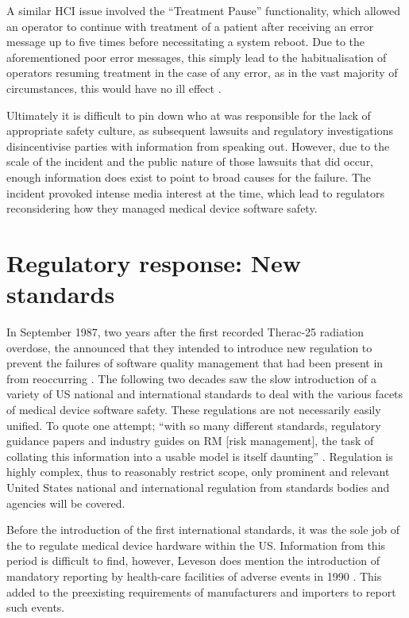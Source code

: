 \documentclass{cshonours}
\newcommand{\ther}{Therac-25\xspace}
\begin{document}
A similar HCI issue involved the ``Treatment Pause'' functionality, which allowed an operator to continue with treatment of a patient after receiving an error message up to five times before necessitating a system reboot. Due to the aforementioned poor error messages, this simply lead to the habitualisation of operators resuming treatment in the case of any error, as in the vast majority of circumstances, this would have no ill effect \cite[p.~301]{saferworld}.

Ultimately it is difficult to pin down who at \aecl was responsible for the lack of appropriate safety culture, as subsequent lawsuits and regulatory investigations disincentivise parties with information from speaking out. However, due to the scale of the incident and the public nature of those lawsuits that did occur, enough information does exist to point to broad causes for the failure. The incident provoked intense media interest at the time, which lead to regulators reconsidering how they managed medical device software safety.


\chapter{Regulatory response: New standards}
\label{chap:newstandards}
In September 1987, two years after the first recorded \ther radiation overdose, the \fda announced that they intended to introduce new regulation to prevent the failures of software quality management that had been present in \aecl from reoccurring \cite{jacky1989programmed}. The following two decades saw the slow introduction of a variety of US national and international standards to deal with the various facets of medical device software safety. These regulations are not necessarily easily unified. To quote one attempt; ``with so many different standards, regulatory guidance papers and industry guides on RM [risk management], the task of collating this information into a usable model is itself daunting'' \cite{burton2006risk}. Regulation is highly complex, thus to reasonably restrict scope, only prominent and relevant United States national and international regulation from standards bodies and agencies will be covered.

Before the introduction of the first international standards, it was the sole job of the \fda to regulate medical device hardware within the US. Information from this period is difficult to find, however, Leveson does mention the introduction of mandatory reporting by health-care facilities of adverse events in 1990 \cite[p.~13]{leveson1993investigation}.  This added to the preexisting requirements of manufacturers and importers to report such events.
\end{document}
